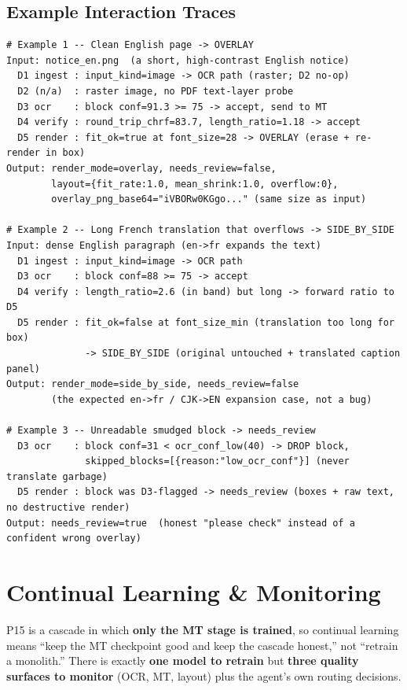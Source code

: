 \documentclass[12pt,a4paper]{article}
\begin{document}
\subsection{Example Interaction Traces}

\begin{lstlisting}
# Example 1 -- Clean English page -> OVERLAY
Input: notice_en.png  (a short, high-contrast English notice)
  D1 ingest : input_kind=image -> OCR path (raster; D2 no-op)
  D2 (n/a)  : raster image, no PDF text-layer probe
  D3 ocr    : block conf=91.3 >= 75 -> accept, send to MT
  D4 verify : round_trip_chrf=83.7, length_ratio=1.18 -> accept
  D5 render : fit_ok=true at font_size=28 -> OVERLAY (erase + re-render in box)
Output: render_mode=overlay, needs_review=false,
        layout={fit_rate:1.0, mean_shrink:1.0, overflow:0},
        overlay_png_base64="iVBORw0KGgo..." (same size as input)

# Example 2 -- Long French translation that overflows -> SIDE_BY_SIDE
Input: dense English paragraph (en->fr expands the text)
  D1 ingest : input_kind=image -> OCR path
  D3 ocr    : block conf=88 >= 75 -> accept
  D4 verify : length_ratio=2.6 (in band) but long -> forward ratio to D5
  D5 render : fit_ok=false at font_size_min (translation too long for box)
              -> SIDE_BY_SIDE (original untouched + translated caption panel)
Output: render_mode=side_by_side, needs_review=false
        (the expected en->fr / CJK->EN expansion case, not a bug)

# Example 3 -- Unreadable smudged block -> needs_review
  D3 ocr    : block conf=31 < ocr_conf_low(40) -> DROP block,
              skipped_blocks=[{reason:"low_ocr_conf"}] (never translate garbage)
  D5 render : block was D3-flagged -> needs_review (boxes + raw text, no destructive render)
Output: needs_review=true  (honest "please check" instead of a confident wrong overlay)
\end{lstlisting}

\section{Continual Learning \& Monitoring}

P15 is a cascade in which \textbf{only the MT stage is trained}, so continual learning means ``keep the MT checkpoint good and keep the cascade honest,'' not ``retrain a monolith.'' There is exactly \textbf{one model to retrain} but \textbf{three quality surfaces to monitor} (OCR, MT, layout) plus the agent's own routing decisions.
\end{document}

